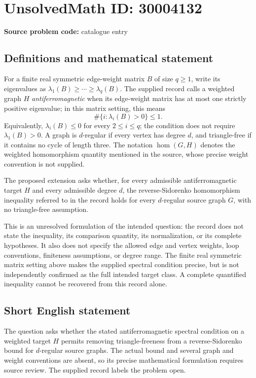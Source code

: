 \documentclass[11pt]{article}
\begin{document}
\section*{UnsolvedMath ID: 30004132}
\textbf{Source problem code:} catalogue entry
\subsection{Definitions and mathematical statement}
For a finite real symmetric edge-weight matrix \(B\) of size \(q\geq 1\), write its eigenvalues as \(\lambda_1(B)\geq\cdots\geq\lambda_q(B)\). The supplied record calls a weighted graph \(H\) \emph{antiferromagnetic} when its edge-weight matrix has at most one strictly positive eigenvalue; in this matrix setting, this means
\[
\#\{i:\lambda_i(B)>0\}\leq 1.
\]
Equivalently, \(\lambda_i(B)\leq 0\) for every \(2\leq i\leq q\); the condition does not require \(\lambda_1(B)>0\). A graph is \(d\)-regular if every vertex has degree \(d\), and triangle-free if it contains no cycle of length three. The notation \(\operatorname{hom}(G,H)\) denotes the weighted homomorphism quantity mentioned in the source, whose precise weight convention is not supplied.

The proposed extension asks whether, for every admissible antiferromagnetic target \(H\) and every admissible degree \(d\), the reverse-Sidorenko homomorphism inequality referred to in the record holds for every \(d\)-regular source graph \(G\), with no triangle-free assumption.

This is an unresolved formulation of the intended question: the record does not state the inequality, its comparison quantity, its normalization, or its complete hypotheses. It also does not specify the allowed edge and vertex weights, loop conventions, finiteness assumptions, or degree range. The finite real symmetric matrix setting above makes the supplied spectral condition precise, but is not independently confirmed as the full intended target class. A complete quantified inequality cannot be recovered from this record alone.
\subsection{Short English statement}
The question asks whether the stated antiferromagnetic spectral condition on a weighted target \(H\) permits removing triangle-freeness from a reverse-Sidorenko bound for \(d\)-regular source graphs. The actual bound and several graph and weight conventions are absent, so its precise mathematical formulation requires source review. The supplied record labels the problem open.
\end{document}

